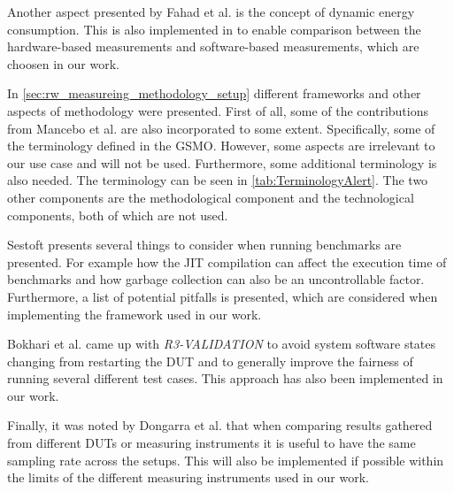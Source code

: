 Another aspect presented by Fahad et al.\cite*{fahad2019comparative} is the concept of dynamic energy consumption. This is also implemented in to enable comparison between the hardware-based measurements and software-based measurements, which are choosen in our work.\newline


In \cref{sec:rw_measureing_methodology_setup} different frameworks and other aspects of methodology were presented. First of all, some of the contributions from Mancebo et al. \cite*{GarciaFEETINGS} are also incorporated to some extent. Specifically, some of the terminology defined in the GSMO. However, some aspects are irrelevant to our use case and will not be used. Furthermore, some additional terminology is also needed. The terminology can be seen in \cref{tab:TerminologyAlert}. The two other components are the methodological component and the technological components, both of which are not used.

Sestoft\cite*{sestoft2013microbenchmarks} presents several things to consider when running benchmarks are presented. For example how the JIT compilation can affect the execution time of benchmarks and how garbage collection can also be an uncontrollable factor. Furthermore, a list of potential pitfalls is presented, which are considered when implementing the framework used in our work. 

Bokhari et al.\cite*{Bokhari2020r3} came up with \textit{R3-VALIDATION} to avoid system software states changing from restarting the DUT and to generally improve the fairness of running several different test cases. This approach has also been implemented in our work.

Finally, it was noted by Dongarra et al.\cite*{Dongarra2012} that when comparing results gathered from different DUTs or measuring instruments it is useful to have the same sampling rate across the setups. This will also be implemented if possible within the limits of the different measuring instruments used in our work.


